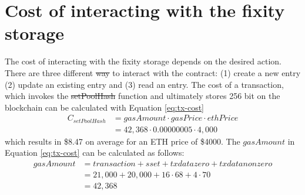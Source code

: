 \documentclass[final]{vutinfth}
\providecommand{\DIFaddtex}[1]{{\protect\color{blue}\uwave{#1}}} %
\providecommand{\DIFdeltex}[1]{{\protect\color{red}\sout{#1}}}                      %
\providecommand{\DIFaddbegin}{} %
\providecommand{\DIFaddend}{} %
\providecommand{\DIFdelbegin}{} %
\providecommand{\DIFdelend}{} %
\providecommand{\DIFadd}[1]{\texorpdfstring{\DIFaddtex{#1}}{#1}} %
\providecommand{\DIFdel}[1]{\texorpdfstring{\DIFdeltex{#1}}{}} %
\begin{document}
\section{Cost of interacting with the fixity storage}\label{sec:cost-interating}
The cost of interacting with the fixity storage depends on the desired action. There are three different \DIFdelbegin \DIFdel{way }\DIFdelend \DIFaddbegin \DIFadd{ways }\DIFaddend to interact with the contract: (1) create a new entry (2) update an existing entry and (3) read an entry.
The cost of a transaction, which invokes the \DIFdelbegin \DIFdel{setPoolHash }\DIFdelend \DIFaddbegin \textit{\DIFadd{setPoolHash}} \DIFaddend function and ultimately stores 256 bit on the blockchain can be calculated with Equation \ref{eq:tx-cost}
\begin{equation}\label{eq:tx-cost}
    \DIFdelbegin %
\DIFdelend \DIFaddbegin \begin{split}
        C_{setPoolHash} & = gasAmount \cdot gasPrice \cdot ethPrice \\ 
        & = 42,368 \cdot 0.00000005 \cdot 4,000
    \end{split}\DIFaddend 
\end{equation}
which results in \$8.47 on average for an ETH price of \$4000.
The $gasAmount$ in Equation \ref{eq:tx-cost} can be calculated as follows:
\begin{equation}\label{eq:tx-data}
  \DIFdelbegin %
\DIFdelend \DIFaddbegin \begin{split}
    gasAmount & = transaction + sset + txdatazero + txdatanonzero \\
     & = 21,000 + 20,000 + 16 \cdot 68 + 4 \cdot 70  \\
     & = 42,368
  \end{split}\DIFaddend 
\end{equation}
\end{document}
